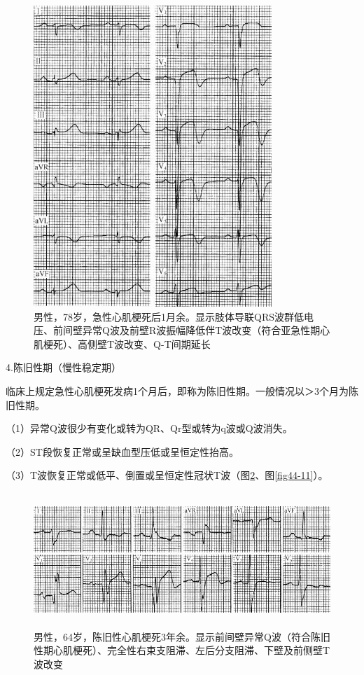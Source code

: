 \begin{figure}[!htbp]
 \centering
 \includegraphics[width=3.54167in,height=4.47917in]{./images/Image00717.jpg}
 \captionsetup{justification=centering}
 \caption{男性，78岁，急性心肌梗死后1月余。显示肢体导联QRS波群低电压、前间壁异常Q波及前壁R波振幅降低伴T波改变（符合亚急性期心肌梗死）、高侧壁T波改变、Q-T间期延长}
 \label{fig44-9}
  \end{figure} 

4.陈旧性期（慢性稳定期）

临床上规定急性心肌梗死发病1个月后，即称为陈旧性期。一般情况以＞3个月为陈旧性期。

（1）异常Q波很少有变化或转为QR、Qr型或转为q波或Q波消失。

（2）ST段恢复正常或呈缺血型压低或呈恒定性抬高。

（3）T波恢复正常或低平、倒置或呈恒定性冠状T波（图\ref{fig44-10}、图\ref{fig44-11}）。

\begin{figure}[!htbp]
 \centering
 \includegraphics[width=5.58333in,height=2in]{./images/Image00718.jpg}
 \captionsetup{justification=centering}
 \caption{男性，64岁，陈旧性心肌梗死3年余。显示前间壁异常Q波（符合陈旧性期心肌梗死）、完全性右束支阻滞、左后分支阻滞、下壁及前侧壁T波改变}
 \label{fig44-10}
  \end{figure} 

